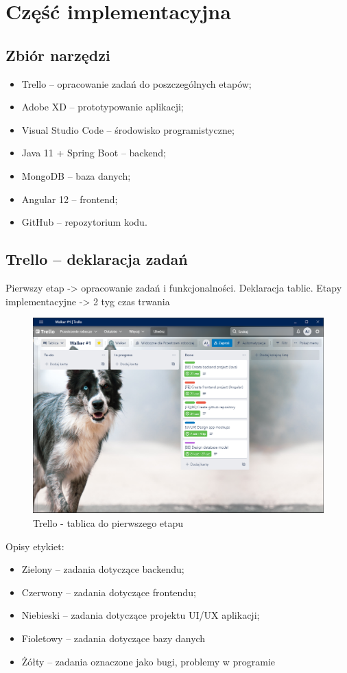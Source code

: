 \chapter{Część implementacyjna}

\section{Zbiór narzędzi}
\begin{itemize}[leftmargin=1cm]
    \item Trello -- opracowanie zadań do poszczególnych etapów;
    \item Adobe XD -- prototypowanie aplikacji;
    \item Visual Studio Code -- środowisko programistyczne;
    \item Java 11 + Spring Boot -- backend;
    \item MongoDB -- baza danych;
    \item Angular 12 -- frontend;
    \item GitHub -- repozytorium kodu.
\end{itemize}

\section{Trello -- deklaracja zadań}
Pierwszy etap -> opracowanie zadań i funkcjonalności. Deklaracja tablic. Etapy implementacyjne -> 2 tyg czas trwania

\begin{figure}[H]
    \centering
    \includegraphics[width=0.7\linewidth]{rysunki/w1.PNG}
    \caption{Trello - tablica do pierwszego etapu}
    \label{fig:walker-board-1}
\end{figure}    

Opisy etykiet:
\begin{itemize}[leftmargin=1cm]
    \item Zielony -- zadania dotyczące backendu;
    \item Czerwony -- zadania dotyczące frontendu;
    \item Niebieski -- zadania dotyczące projektu UI/UX aplikacji;
    \item Fioletowy -- zadania dotyczące bazy danych
    \item Żółty -- zadania oznaczone jako bugi, problemy w programie
\end{itemize}

